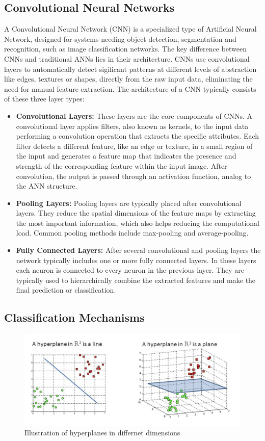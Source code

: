 \documentclass[12pt,fleqn,a4paper]{article}
\begin{document}
\subsection{Convolutional Neural Networks}
A Convolutional Neural Network (CNN) is a specialized type of Artificial Neural Network, designed for systems needing object detection, segmentation and recognition, such as image classification networks. The key difference between CNNs and traditional ANNs lies in their architecture. CNNs use convolutional layers to automatically detect sigificant patterns at different levels of abstraction like edges, textures or shapes, directly from the raw input data, eliminating the need for manual feature extraction.
The architecture of a CNN typically consists of these three layer types:
\begin{itemize}
\item\textbf{Convolutional Layers:} These layers are the core components of CNNs. A convolutional layer applies filters, also known as kernels, to the input data performing a convolution operation that extracts the specific attributes. Each filter detects a different feature, like an edge or texture, in a small region of the input and generates a feature map that indicates the presence and strength of the corresponding feature within the input image. After convolution, the output is passed through an activation function, analog to the ANN structure.

\item\textbf{Pooling Layers:} Pooling layers are typically placed after convolutional layers. They reduce the spatial dimensions of the feature maps by extracting the most important information, which also helps reducing the computational load. Common pooling methods include max-pooling and average-pooling.

\item\textbf{Fully Connected Layers:} After several convolutional and pooling layers the network typically includes one or more fully connected layers. In these layers each neuron is connected to every neuron in the previous layer. They are typically used to hierarchically combine the extracted features and make the final prediction or classification.
\end{itemize}

\subsection{Classification Mechanisms}
\begin{figure}[H]
    \centering
    \includegraphics[width=0.7\linewidth]{graphs/hyperplane.png}
    \caption{Illustration of hyperplanes in differnet dimensions \cite{Hyperplane}}
    \label{fig:hyperplane}
\end{figure}
\end{document}
